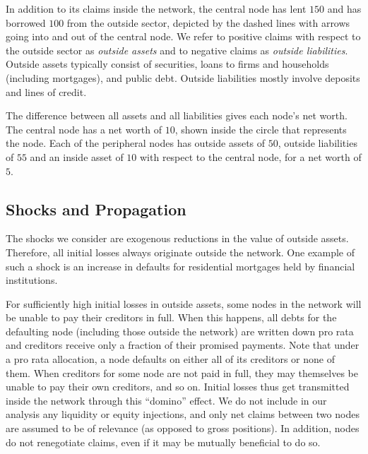 In addition to its claims inside the network, the central node has lent $150$ and has borrowed $100$ from the outside sector, depicted by the dashed lines with arrows going into and out of the central node. We refer to positive claims with respect to the outside sector as \textit{outside assets} and to negative claims as \textit{outside liabilities}. Outside assets typically consist of securities, loans to firms and households (including mortgages), and public debt. Outside liabilities mostly involve deposits and lines of credit.

The difference between all assets and all liabilities gives each node's net worth. The central node has a net worth of $10$, shown inside the circle that represents the node.  Each of the peripheral nodes has outside assets of $50$, outside liabilities of $55$ and an inside asset of $10$ with respect to the central node, for a net worth of $5$.

\subsection{Shocks and Propagation}

The shocks we consider are exogenous reductions in the value of outside assets. Therefore, all initial losses always originate outside the network. One example of such a shock is an increase in defaults for residential mortgages held by financial institutions.

For sufficiently high initial losses in outside assets, some nodes in the network will be unable to pay their creditors in full. When this happens, all debts for the defaulting node (including those outside the network) are written down pro rata and creditors receive only a fraction of their promised payments. Note that under a pro rata allocation, a node defaults on either all of its creditors or none of them. When creditors for some node are not paid in full, they may themselves be unable to pay their own creditors, and so on. Initial losses thus get transmitted inside the network through this ``domino'' effect. We do not include in our analysis any liquidity or equity injections, and only net claims between two nodes are assumed to be of relevance (as opposed to gross positions). In addition, nodes do not renegotiate claims, even if it may be mutually beneficial to do so.

